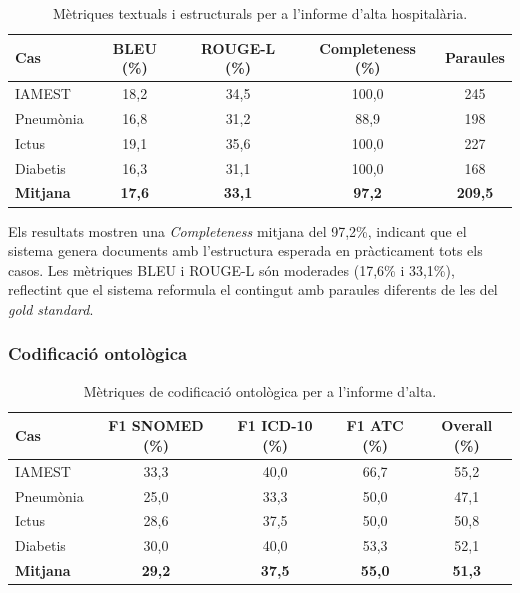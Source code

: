\documentclass[CAT]{TFUOC}%
\begin{document}
\begin{table}[H]
\centering
\small
\begin{tabular}{lcccc}
\hline
\textbf{Cas} & \textbf{BLEU (\%)} & \textbf{ROUGE-L (\%)} & \textbf{Completeness (\%)} & \textbf{Paraules} \\
\hline
IAMEST & 18,2 & 34,5 & 100,0 & 245 \\
Pneumònia & 16,8 & 31,2 & 88,9 & 198 \\
Ictus & 19,1 & 35,6 & 100,0 & 227 \\
Diabetis & 16,3 & 31,1 & 100,0 & 168 \\
\hline
\textbf{Mitjana} & \textbf{17,6} & \textbf{33,1} & \textbf{97,2} & \textbf{209,5} \\
\hline
\end{tabular}
\caption{Mètriques textuals i estructurals per a l'informe d'alta hospitalària.}
\label{tab:discharge-textual}
\end{table}

Els resultats mostren una \textit{Completeness} mitjana del 97,2\%, indicant que el sistema genera documents amb l'estructura esperada en pràcticament tots els casos. Les mètriques BLEU i ROUGE-L són moderades (17,6\% i 33,1\%), reflectint que el sistema reformula el contingut amb paraules diferents de les del \textit{gold standard}.

\subsubsection{Codificació ontològica}

\begin{table}[H]
\centering
\small
\begin{tabular}{lcccc}
\hline
\textbf{Cas} & \textbf{F1 SNOMED (\%)} & \textbf{F1 ICD-10 (\%)} & \textbf{F1 ATC (\%)} & \textbf{Overall (\%)} \\
\hline
IAMEST & 33,3 & 40,0 & 66,7 & 55,2 \\
Pneumònia & 25,0 & 33,3 & 50,0 & 47,1 \\
Ictus & 28,6 & 37,5 & 50,0 & 50,8 \\
Diabetis & 30,0 & 40,0 & 53,3 & 52,1 \\
\hline
\textbf{Mitjana} & \textbf{29,2} & \textbf{37,5} & \textbf{55,0} & \textbf{51,3} \\
\hline
\end{tabular}
\caption{Mètriques de codificació ontològica per a l'informe d'alta.}
\label{tab:discharge-ontology}
\end{table}
\end{document}
